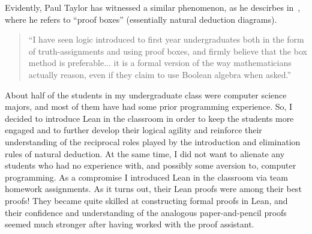 \documentclass[11pt]{amsart}  %
\begin{document}
Evidently, Paul Taylor has witnessed a similar phenomenon, as
he descirbes in~\cite{MR1694820}, where he refers to ``proof boxes'' (essentially natural deduction diagrams).
\begin{quote}
``I have seen logic introduced to first year undergraduates
both in the form of truth-assignments and using proof boxes, and firmly
believe that the box method is preferable... %
it is a formal version of the way mathematicians
actually reason, even if they claim to use Boolean algebra when asked.''
\end{quote}
About half of the students in my undergraduate class were computer science majors, and most of them have had some prior programming experience.
So, I decided to introduce Lean in the classroom in order to keep the students  more engaged and to further develop their logical agility and reinforce their understanding of the reciprocal roles played by the introduction and elimination rules of natural deduction.
At the same time, I did not want to alienate any students who had no experience 
with, and possibly some aversion to, computer programming.
As a compromise I introduced Lean in the classroom via team homework
assignments. As it turns out, their Lean proofs were among their best proofs!  They became quite skilled at constructing formal proofs in Lean, and their confidence and understanding of the analogous paper-and-pencil proofs seemed much stronger after having worked with the proof assistant.






\fi




\end{document}
